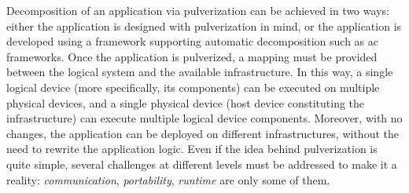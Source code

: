 \documentclass[12pt]{article}
\begin{document}
%
Decomposition of an application via pulverization can be achieved in two ways:
either the application is designed with pulverization in mind,
or the application is developed using a framework supporting automatic decomposition such as \ac{ac} frameworks.
%
Once the application is pulverized,
a mapping must be provided between the logical system and the available infrastructure.
%
In this way,
a single logical device (more specifically, its components) can be executed on multiple physical devices,
and a single physical device (host device constituting the infrastructure) can execute multiple logical device components.
%
Moreover,
with no changes,
the application can be deployed on different infrastructures,
without the need to rewrite the application logic.
%
Even if the idea behind pulverization is quite simple,
several challenges at different levels must be addressed to make it a reality:
\emph{communication}, \emph{portability}, \emph{runtime} are only some of them.


\newpage

\end{document}
